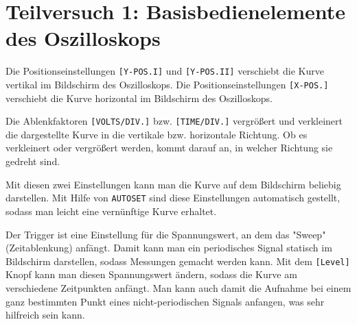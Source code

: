 \section{Teilversuch 1: Basisbedienelemente des Oszilloskops}
	Die Positionseinstellungen \texttt{[Y-POS.I]} und \texttt{[Y-POS.II]} verschiebt die Kurve vertikal im Bildschirm des Oszilloskops. Die Positionseinstellungen \texttt{[X-POS.]} verschiebt die Kurve horizontal im Bildschirm des Oszilloskops. 

	Die Ablenkfaktoren \texttt{[VOLTS/DIV.]} bzw. \texttt{[TIME/DIV.]} vergrößert und verkleinert die dargestellte Kurve in die vertikale bzw. horizontale Richtung. Ob es verkleinert oder vergrößert werden, kommt darauf an, in welcher Richtung sie gedreht sind. 

	Mit diesen zwei Einstellungen kann man die Kurve auf dem Bildschirm beliebig darstellen. Mit Hilfe von \texttt{AUTOSET} sind diese Einstellungen automatisch gestellt, sodass man leicht eine vernünftige Kurve erhaltet. 

	Der Trigger ist eine Einstellung für die Spannungswert, an dem das "Sweep" (Zeitablenkung) anfängt. Damit kann man ein periodisches Signal statisch im Bildschirm darstellen, sodass Messungen gemacht werden kann. Mit dem \texttt{[Level]} Knopf kann man diesen Spannungswert ändern, sodass die Kurve am verschiedene Zeitpunkten anfängt. Man kann auch damit die Aufnahme bei einem ganz bestimmten Punkt eines nicht-periodischen Signals anfangen, was sehr hilfreich sein kann. 
